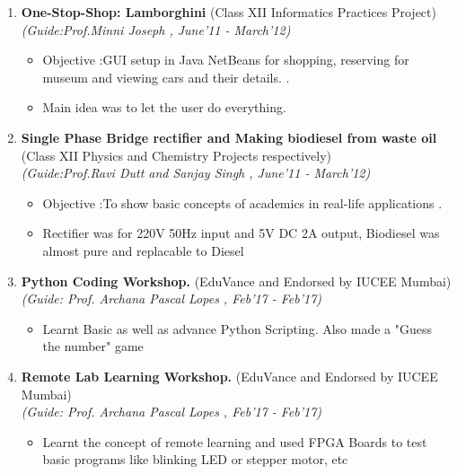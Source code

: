 \documentclass[a4paper,10pt]{article}
\newcommand{\isep}{-2 pt}
\begin{document}
\begin{enumerate}
\item \textbf{One-Stop-Shop: Lamborghini
} (Class XII Informatics Practices Project) \\
 \emph{(Guide:Prof.Minni Joseph
, June'11 - March'12)} \\[-0.6cm]
	\begin{itemize}\itemsep \isep
	\item Objective :GUI setup in Java NetBeans for shopping, reserving for museum and viewing cars and their details.
.
	\item Main idea was to let the user do everything.

	\end{itemize}

\item \textbf{Single Phase Bridge rectifier and Making biodiesel from waste oil
} (Class XII Physics and Chemistry Projects respectively) \\
 \emph{(Guide:Prof.Ravi Dutt and Sanjay Singh
, June'11 - March'12)} \\[-0.6cm]
	\begin{itemize}\itemsep \isep
	\item Objective :To show basic concepts of academics in real-life applications
.
	\item Rectifier was for 220V 50Hz input and 5V DC 2A output, Biodiesel was almost pure and replacable to Diesel

	\end{itemize}

\item \textbf{Python Coding Workshop.
} (EduVance and Endorsed by IUCEE Mumbai) \\
 \emph{(Guide: Prof. Archana Pascal Lopes
, Feb'17 - Feb'17)} \\[-0.6cm]
	\begin{itemize}\itemsep \isep
	\item Learnt Basic as well as advance Python Scripting. Also made a "Guess the number" game
	\end{itemize}

\item \textbf{Remote Lab Learning Workshop.
} (EduVance and Endorsed by IUCEE Mumbai) \\
 \emph{(Guide: Prof. Archana Pascal Lopes
, Feb'17 - Feb'17)} \\[-0.6cm]
	\begin{itemize}\itemsep \isep
	\item Learnt the concept of remote learning and used FPGA Boards to test basic programs like blinking LED or stepper motor, etc
	\end{itemize}


\end{enumerate}
\end{document}
